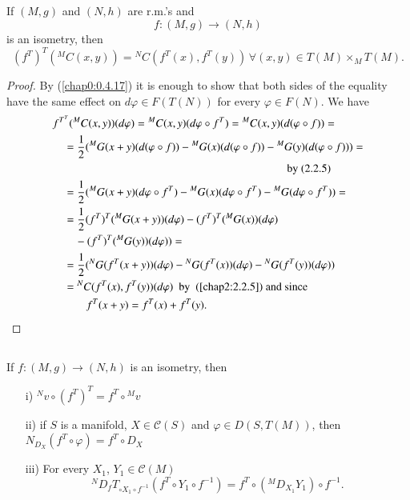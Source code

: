 \setcounter{subsection}{4}

\subsection{}\label{chap5:5.1.5}

\begin{prop*}
If $(M,g)$ and $(N,h)$ are r.m.'s and
$$
f:(M,g)\to (N,h)
$$
is an isometry, then
$$
(f^{T})^{T}({}^MC(x,y))={}^{N}C(f^{T}(x),f^{T}(y)) \, \forall (x,y)\in
T(M)\mathop{\times}_{M}T(M).  
$$
\end{prop*}

\begin{proof}
By (\ref{chap0:0.4.17}) it is enough to show that both sides of the
equality have the same effect on $d\varphi\in F(T(N))$ for every
$\varphi \in F(N)$. We have
\begin{align*}
&f^{T^{T}}({}^{M}C(x,y))(d\varphi)={}^{M}C(x,y)(d\varphi\circ f^{T})= {}^{M}C(x,y)(d(\varphi\circ f))=\\
&\quad= \frac{1}{2}({}^{M}G(x+y)(d(\varphi\circ
  f))-{}^{M}G(x)(d(\varphi\circ f))-{}^{M}G(y)(d(\varphi\circ f)))=\\
&\quad\hspace{7cm} \text{by (2.2.5)}\\
&\quad= \frac{1}{2}({}^{M}G(x+y)(d\varphi\circ
  f^{T})-{}^{M}G(x)(d\varphi\circ f^{T})-{}^{M}G(d\varphi\circ
  f^{T}))=\\
&\quad=\frac{1}{2}(f^{T})^{T}({}^{M}G(x+y))(d\varphi)-(f^{T})^{T}({}^{M}G(x))(d\varphi)\\
&\qquad{}-(f^{T})^{T}({}^{M}G(y))(d\varphi))=\\
&\quad=\frac{1}{2}({}^{N}G(f^{T}(x+y))(d\varphi)-{}^{N}G(f^{T}(x))(d\varphi)-{}^{N}G(f^{T}(y))(d\varphi))\\
&\quad= {}^{N}C(f^{T}(x),f^{T}(y))(d\varphi)\text{ \ by \ (\eqref{chap2:2.2.5}) and
    since}\\
&\quad\qquad f^{T}(x+y)=f^{T}(x)+f^{T}(y).
\end{align*}
\end{proof}

\subsection{}\label{chap5:5.1.6}

\begin{coro*}
If \pageoriginale $f:(M,g)\to (N,h)$ is an isometry, then 
\begin{itemize}
\item[{\rm i)}] ${}^{N}v\circ (f^{T})^{T}=f^{T}\circ {}^{M}v$

\item[{\rm ii)}] if $S$ is a manifold, $X\in\mathscr{C}(S)$ and
  $\varphi\in D(S,T(M))$, then
  $N_{D_{X}}(f^{T}\circ\varphi)=f^{T}\circ D_{X}$

\item[{\rm iii)}] For every $X_{1}$, $Y_{1}\in\mathscr{C}(M)$
$$
{}^{N}D_{f}T_{\circ X_{1}\circ f^{-1}}(f^{T}\circ Y_{1}\circ
f^{-1})=f^{T}\circ ({}^{M}D_{X_{1}}Y_{1})\circ f^{-1}.
$$
\end{itemize}
\end{coro*}

